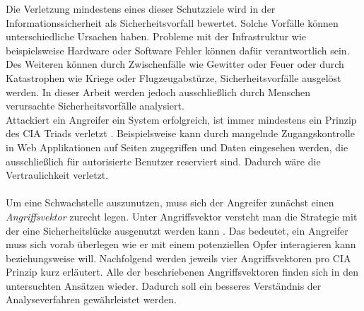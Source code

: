 \documentclass[
    12pt, %
    DIV10,
    ngerman, %
    a4paper, %
    oneside, %
    titlepage, %
    parskip=half, %
    headings=normal, %
    listof=totoc, %
    bibliography=totoc, %
    index=totoc, %
    captions=tableheading, %
    final %
]{scrreprt}
\begin{document}
Die Verletzung mindestens eines dieser Schutzziele wird in der Informationssicherheit als Sicherheitsvorfall bewertet. 
Solche Vorfälle können unterschiedliche Ursachen haben. Probleme mit der Infrastruktur wie beispielsweise Hardware oder Software Fehler können dafür verantwortlich sein. Des Weiteren können durch Zwischenfälle wie Gewitter oder Feuer oder durch Katastrophen wie Kriege oder Flugzeugabstürze, Sicherheitsvorfälle ausgelöst werden. In dieser Arbeit werden jedoch ausschlie{\ss}lich durch Menschen verursachte Sicherheitsvorfälle analysiert.\\
Attackiert ein Angreifer ein System erfolgreich, ist immer mindestens ein Prinzip des CIA Triads verletzt \parencite{ingeno2018software}.
Beispielsweise kann durch mangelnde Zugangskontrolle in Web Applikationen auf Seiten zugegriffen und Daten eingesehen werden, die ausschlie{\ss}lich für autorisierte Benutzer reserviert sind. Dadurch wäre die Vertraulichkeit verletzt.\\\\
Um eine Schwachstelle auszunutzen, muss sich der Angreifer zunächst einen \emph{Angriffsvektor} zurecht legen. Unter Angriffsvektor versteht man die Strategie mit der eine Sicherheitslücke ausgenutzt werden kann \parencite{rahalkar2018network}. Das bedeutet, ein Angreifer muss sich vorab überlegen wie er mit einem potenziellen Opfer interagieren kann beziehungsweise will. Nachfolgend werden jeweils vier Angriffsvektoren pro CIA Prinzip kurz erläutert. Alle der beschriebenen Angriffsvektoren finden sich in den untersuchten Ansätzen wieder. Dadurch soll ein besseres Verständnis der Analyseverfahren gewährleistet werden.
\end{document}
